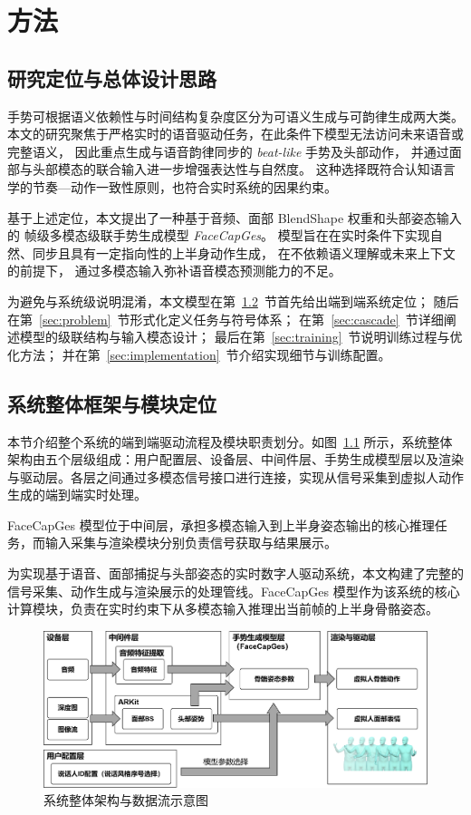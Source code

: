 
\chapter{方法}

\section{研究定位与总体设计思路}
手势可根据语义依赖性与时间结构复杂度区分为可语义生成与可韵律生成两大类。
本文的研究聚焦于严格实时的语音驱动任务，在此条件下模型无法访问未来语音或完整语义，
因此重点生成与语音韵律同步的 \emph{beat-like} 手势及头部动作，
并通过面部与头部模态的联合输入进一步增强表达性与自然度。
这种选择既符合认知语言学的节奏—动作一致性原则，也符合实时系统的因果约束。

基于上述定位，本文提出了一种基于音频、面部 BlendShape 权重和头部姿态输入的
帧级多模态级联手势生成模型 \emph{FaceCapGes}。
模型旨在在实时条件下实现自然、同步且具有一定指向性的上半身动作生成，
在不依赖语义理解或未来上下文的前提下，
通过多模态输入弥补语音模态预测能力的不足。

为避免与系统级说明混淆，本文模型在第~\ref{sec:system}~节首先给出端到端系统定位；
随后在第~\ref{sec:problem}~节形式化定义任务与符号体系；
在第~\ref{sec:cascade}~节详细阐述模型的级联结构与输入模态设计；
最后在第~\ref{sec:training}~节说明训练过程与优化方法；
并在第~\ref{sec:implementation}~节介绍实现细节与训练配置。

\section{系统整体框架与模块定位}
\label{sec:system}
本节介绍整个系统的端到端驱动流程及模块职责划分。如图~\ref{fig:system_architecture} 所示，系统整体架构由五个层级组成：用户配置层、设备层、中间件层、手势生成模型层以及渲染与驱动层。各层之间通过多模态信号接口进行连接，实现从信号采集到虚拟人动作生成的端到端实时处理。

FaceCapGes 模型位于中间层，承担多模态输入到上半身姿态输出的核心推理任务，而输入采集与渲染模块分别负责信号获取与结果展示。

为实现基于语音、面部捕捉与头部姿态的实时数字人驱动系统，本文构建了完整的信号采集、动作生成与渲染展示的处理管线。FaceCapGes 模型作为该系统的核心计算模块，负责在实时约束下从多模态输入推理出当前帧的上半身骨骼姿态。

\begin{figure}[h!t]
\centering
\includegraphics[width=\textwidth]{figures/SystemArchitecture.png}
\caption{系统整体架构与数据流示意图}
\label{fig:system_architecture}
\end{figure}

